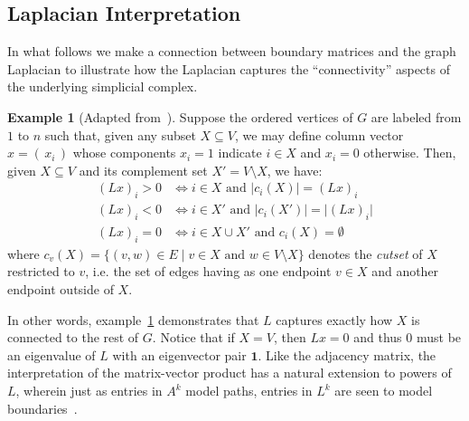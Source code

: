\documentclass[10pt]{article}
\numberwithin{equation}{section}
\newcommand{\+}{%
	\raisebox{0.18ex}{\scaleobj{0.55}{+}}
}
\theoremstyle{definition}
\theoremstyle{definition}
\newtheorem{example}{Example}[section]
\begin{document}
\subsection{Laplacian Interpretation}
In what follows we make a connection between boundary matrices and the graph Laplacian to illustrate how the Laplacian captures the ``connectivity'' aspects of the underlying simplicial complex. 
 \begin{example}[Adapted from~\cite{newman2001laplacian}]\label{ex:laplacian}
Suppose the ordered vertices of $G$ are labeled from $1$ to $n$ such that, given any subset $X \subseteq V$, we may define column vector $x = (\, x_i\, )$ whose components $x_i = 1$ indicate $i \in X$ and $x_i = 0$ otherwise. Then, given $X \subseteq V$ and its complement set $X' = V \setminus X$, we have:
\begin{align*}
	(Lx)_i > 0 &\Longleftrightarrow i \in X \text{ and } \lvert c_i(X) \rvert = (Lx)_i  \\
	(Lx)_i < 0 &\Longleftrightarrow i \in X' \text{ and } \lvert c_i(X') \rvert = \lvert (Lx)_i \rvert \\
	(Lx)_i = 0 &\Longleftrightarrow i \in X \cup X' \text{ and } c_i(X) = \emptyset
\end{align*}
where $c_v(X) = \{ (v,w) \in E \mid v \in X \text{ and } w \in V \setminus X \}$ denotes the \emph{cutset}  of $X$ restricted to $v$, i.e. the set of edges having as one endpoint $v \in X$ and another endpoint outside of $X$.
\end{example}
\noindent In other words, example~\ref{ex:laplacian} demonstrates that $L$ captures exactly how $X$ is connected to the rest of $G$. Notice that if $X  = V$, then $Lx = 0$ and thus $0$ must be an eigenvalue of $L$ with an eigenvector pair $\mathbf{1}$. Like the adjacency matrix, the interpretation of the matrix-vector product has a natural extension to powers of $L$, wherein just as entries in $A^k$ model paths, entries in $L^k$ are seen to model boundaries~\cite{newman2001laplacian}.
\end{document}
